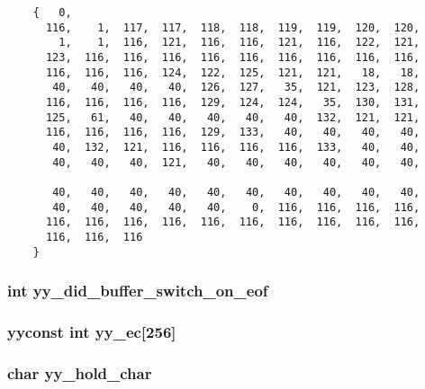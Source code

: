 \footnotesize\begin{verbatim}
    {   0,
      116,    1,  117,  117,  118,  118,  119,  119,  120,  120,
        1,    1,  116,  121,  116,  116,  121,  116,  122,  121,
      123,  116,  116,  116,  116,  116,  116,  116,  116,  116,
      116,  116,  116,  124,  122,  125,  121,  121,   18,   18,
       40,   40,   40,   40,  126,  127,   35,  121,  123,  128,
      116,  116,  116,  116,  129,  124,  124,   35,  130,  131,
      125,   61,   40,   40,   40,   40,   40,  132,  121,  121,
      116,  116,  116,  116,  129,  133,   40,   40,   40,   40,
       40,  132,  121,  116,  116,  116,  116,  133,   40,   40,
       40,   40,   40,  121,   40,   40,   40,   40,   40,   40,

       40,   40,   40,   40,   40,   40,   40,   40,   40,   40,
       40,   40,   40,   40,   40,    0,  116,  116,  116,  116,
      116,  116,  116,  116,  116,  116,  116,  116,  116,  116,
      116,  116,  116
    }\end{verbatim}\normalsize 
{}
\subsubsection{\setlength{\rightskip}{0pt plus 5cm}int yy\_\-did\_\-buffer\_\-switch\_\-on\_\-eof\hspace{0.3cm}{\tt  [static]}}\label{vcd__lexer_8c_a83}


\subsubsection{\setlength{\rightskip}{0pt plus 5cm}yyconst int yy\_\-ec[256]\hspace{0.3cm}{\tt  [static]}}\label{vcd__lexer_8c_a88}


\subsubsection{\setlength{\rightskip}{0pt plus 5cm}char yy\_\-hold\_\-char\hspace{0.3cm}{\tt  [static]}}\label{vcd__lexer_8c_a78}


